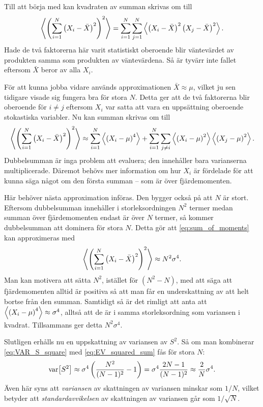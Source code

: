 Till att börja med kan kvadraten av summan skrivas om till
\begin{equation}
\ev{\left(\sum_{i=1}^N\left(X_i-\bar{X}\right)^2 \right)^2} 
= \sum_{i=1}^N \sum_{j=1}^N
\ev{ \left(X_i-\bar{X}\right)^2\left(X_j-\bar{X}\right)^2 }.
\end{equation}
Hade de två faktorerna här varit statistiskt oberoende blir väntevärdet av produkten samma som produkten av väntevärdena\cite{Rice_matstat2006}. Så är tyvärr inte fallet eftersom $\bar{X}$ beror av alla $X_i$.

För att kunna jobba vidare används approximationen $\bar{X}\approx \mu$, vilket ju sen tidigare visade sig fungera bra för stora $N$. Detta ger att de två faktorerna blir oberoende för $i\neq j$ eftersom $X_i$ var satta att vara en uppsättning oberoende stokastiska variabler. Nu kan summan skrivas om till
\begin{equation}\label{eq:sum_of_moments}
\ev{\left(\sum_{i=1}^N\left(X_i-\bar{X}\right)^2 \right)^2} 
\approx
\sum_{i=1}^N \ev{\left(X_i-\mu \right)^4} 
+\sum_{i=1}^N\sum_{j\neq i} 
\ev{\left(X_i-\mu \right)^2}\ev{\left(X_j-\mu \right)^2}.
\end{equation}
Dubbelsumman är inga problem att evaluera; den innehåller bara varianserna multiplicerade. Däremot behövs mer information om hur $X_i$ är fördelade för att kunna säga något om den första summan -- som är över fjärdemomenten.

Här behöver nästa approximation införas. Den bygger också på att $N$ är stort. Eftersom dubbelsumman innehåller i storleksordningen $N^2$ termer medan summan över fjärdemomenten endast är över $N$ termer, så kommer dubbelsumman att dominera för stora $N$. Detta gör att \eqref{eq:sum_of_moments} kan approximeras med
\begin{equation}\label{eq:EV_squared_sum}
\ev{\left(\sum_{i=1}^N\left(X_i-\bar{X}\right)^2 \right)^2} 
\approx
N^2\sigma^4.
\end{equation}
Man kan motivera att sätta $N^2$, istället för $(N^2-N)$, med att säga att fjärdemomenten alltid är positiva så att man får en underskattning av att helt bortse från den summan. Samtidigt så är det rimligt att anta att $\ev{\left(X_i-\mu\right)^4}\approx\sigma^4$, alltså att de är i samma storleksordning som variansen i kvadrat. Tillsammans ger detta $N^2\sigma^4$.

Slutligen erhålls nu en uppskattning av variansen av $S^2$. Så om man kombinerar \eqref{eq:VAR_S_square} med \eqref{eq:EV_squared_sum} fås för stora $N$: 
\begin{equation}
\text{var}\!\left[S^2\right] 
\approx \sigma^4\left(\frac{N^2}{(N-1)^2} -1 \right) 
=\sigma^4\frac{2N-1}{(N-1)^2}
\approx \frac{2}{N}\sigma^4.
\end{equation}
Även här syns att \emph{variansen} av skattningen av variansen minskar som $1/N$, vilket betyder att \emph{standardavvikelsen} av skattningen av variansen går som $1/\sqrt{N}$. 


